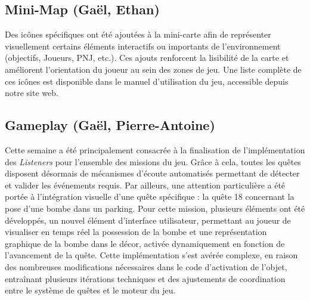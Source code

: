 \documentclass{report}
\begin{document}
\subsection*{Mini-Map (Gaël, Ethan)}
Des icônes spécifiques ont été ajoutées à la mini-carte afin de représenter visuellement certains éléments interactifs ou importants de l’environnement (objectifs, Joueurs, PNJ, etc.). Ces ajouts renforcent la lisibilité de la carte et améliorent l’orientation du joueur au sein des zones de jeu. Une liste complète de ces icônes est disponible dans le manuel d’utilisation du jeu, accessible depuis notre site web.

\subsection*{Gameplay (Gaël, Pierre-Antoine)}
Cette semaine a été principalement consacrée à la finalisation de l’implémentation des \textit{Listeners} pour l’ensemble des missions du jeu. Grâce à cela, toutes les quêtes disposent désormais de mécanismes d’écoute automatisés permettant de détecter et valider les événements requis. Par ailleurs, une attention particulière a été portée à l’intégration visuelle d’une quête spécifique : la quête 18 concernant la pose d’une bombe dans un parking. Pour cette mission, plusieurs éléments ont été développés, un nouvel élément d’interface utilisateur, permettant au joueur de visualiser en temps réel la possession de la bombe et une représentation graphique de la bombe dans le décor, activée dynamiquement en fonction de l’avancement de la quête. Cette implémentation s’est avérée complexe, en raison des nombreuses modifications nécessaires dans le code d’activation de l’objet, entraînant plusieurs itérations techniques et des ajustements de coordination entre le système de quêtes et le moteur du jeu.
\end{document}

